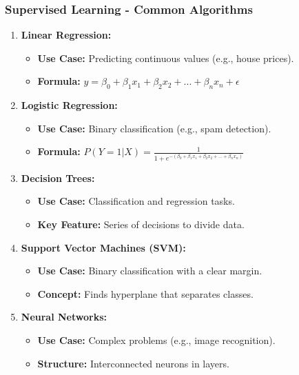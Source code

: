 \documentclass[aspectratio=169]{beamer}
\begin{document}
\begin{frame}
    \frametitle{Supervised Learning - Common Algorithms}
    \begin{enumerate}
        \item \textbf{Linear Regression:}
        \begin{itemize}
            \item \textbf{Use Case:} Predicting continuous values (e.g., house prices).
            \item \textbf{Formula:} $y = \beta_0 + \beta_1 x_1 + \beta_2 x_2 + ... + \beta_n x_n + \epsilon$
        \end{itemize}

        \item \textbf{Logistic Regression:}
        \begin{itemize}
            \item \textbf{Use Case:} Binary classification (e.g., spam detection).
            \item \textbf{Formula:} $P(Y=1|X) = \frac{1}{1 + e^{-(\beta_0 + \beta_1 x_1 + \beta_2 x_2 + ... + \beta_n x_n)}}$
        \end{itemize}

        \item \textbf{Decision Trees:}
        \begin{itemize}
            \item \textbf{Use Case:} Classification and regression tasks.
            \item \textbf{Key Feature:} Series of decisions to divide data.
        \end{itemize}

        \item \textbf{Support Vector Machines (SVM):}
        \begin{itemize}
            \item \textbf{Use Case:} Binary classification with a clear margin.
            \item \textbf{Concept:} Finds hyperplane that separates classes.
        \end{itemize}
        
        \item \textbf{Neural Networks:}
        \begin{itemize}
            \item \textbf{Use Case:} Complex problems (e.g., image recognition).
            \item \textbf{Structure:} Interconnected neurons in layers.
        \end{itemize}
    \end{enumerate}
\end{frame}
\end{document}
